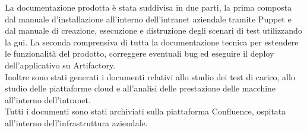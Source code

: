 La documentazione prodotta è stata suddivisa in due parti, la prima composta dal manuale d'installazione all'interno dell'\gls{intranet} aziendale tramite Puppet e dal manuale di creazione, esecuzione e distruzione degli scenari di test utilizzando la \gls{gui}. La seconda comprensiva di tutta la documentazione tecnica per estendere le funzionalità del prodotto, correggere eventuali bug ed eseguire il \gls{deploy} dell'applicativo su Artifactory.\\
Inoltre sono stati generati i documenti relativi allo studio dei test di carico, allo studio delle piattaforme cloud e all'analisi delle prestazione delle macchine all'interno dell'\gls{intranet}.\\
Tutti i documenti sono stati archiviati sulla piattaforma Confluence, ospitata all'interno dell'infrastruttura aziendale.